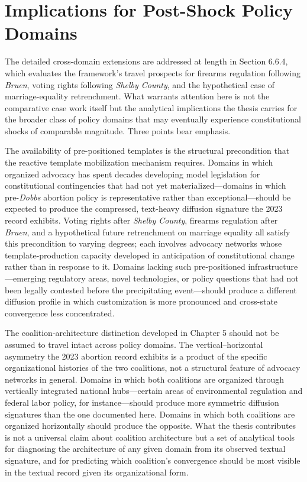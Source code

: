 \section{Implications for Post-Shock Policy Domains}
 
The detailed cross-domain extensions are addressed at length in Section 6.6.4, which evaluates the framework's travel prospects for firearms regulation following \textit{Bruen}, voting rights following \textit{Shelby County}, and the hypothetical case of marriage-equality retrenchment. What warrants attention here is not the comparative case work itself but the analytical implications the thesis carries for the broader class of policy domains that may eventually experience constitutional shocks of comparable magnitude. Three points bear emphasis.
 
The availability of pre-positioned templates is the structural precondition that the reactive template mobilization mechanism requires. Domains in which organized advocacy has spent decades developing model legislation for constitutional contingencies that had not yet materialized---domains in which pre-\textit{Dobbs} abortion policy is representative rather than exceptional---should be expected to produce the compressed, text-heavy diffusion signature the 2023 record exhibits. Voting rights after \textit{Shelby County}, firearms regulation after \textit{Bruen}, and a hypothetical future retrenchment on marriage equality all satisfy this precondition to varying degrees; each involves advocacy networks whose template-production capacity developed in anticipation of constitutional change rather than in response to it. Domains lacking such pre-positioned infrastructure---emerging regulatory areas, novel technologies, or policy questions that had not been legally contested before the precipitating event---should produce a different diffusion profile in which customization is more pronounced and cross-state convergence less concentrated.
 
The coalition-architecture distinction developed in Chapter 5 should not be assumed to travel intact across policy domains. The vertical--horizontal asymmetry the 2023 abortion record exhibits is a product of the specific organizational histories of the two coalitions, not a structural feature of advocacy networks in general. Domains in which both coalitions are organized through vertically integrated national hubs---certain areas of environmental regulation and federal labor policy, for instance---should produce more symmetric diffusion signatures than the one documented here. Domains in which both coalitions are organized horizontally should produce the opposite. What the thesis contributes is not a universal claim about coalition architecture but a set of analytical tools for diagnosing the architecture of any given domain from its observed textual signature, and for predicting which coalition's convergence should be most visible in the textual record given its organizational form.
 
